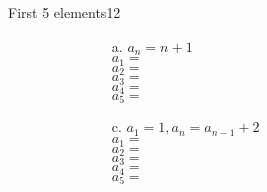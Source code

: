 \documentclass[a4paper,12pt]{book}
\begin{document}
    \hrulefill{}
    
    \begin{answersheetquestion}{2}{First 5 elements}{12}

    \begin{figure}[h]
        \centering
        \begin{subfigure}{.5\textwidth}
            \centering
            
            \begin{itemize}
                \item[a.] $a_{n} = n+1$ \\
                    $a_{1} = $ \iftoggle{answerkey}{ \begin{answer} 2 \end{answer} }{} \\
                    $a_{2} = $ \iftoggle{answerkey}{ \begin{answer} 3 \end{answer} }{} \\
                    $a_{3} = $ \iftoggle{answerkey}{ \begin{answer} 4 \end{answer} }{} \\
                    $a_{4} = $ \iftoggle{answerkey}{ \begin{answer} 5 \end{answer} }{} \\
                    $a_{5} = $ \iftoggle{answerkey}{ \begin{answer} 6 \end{answer} }{} \\
   
                \item[c.] $a_{1} = 1, a_{n} = a_{n-1} + 2$ \\
                    $a_{1} = $ \iftoggle{answerkey}{ \begin{answer} 1 \end{answer} }{} \\
                    $a_{2} = $ \iftoggle{answerkey}{ \begin{answer} 3 \end{answer} }{} \\
                    $a_{3} = $ \iftoggle{answerkey}{ \begin{answer} 5 \end{answer} }{} \\
                    $a_{4} = $ \iftoggle{answerkey}{ \begin{answer} 9 \end{answer} }{} \\
                    $a_{5} = $ \iftoggle{answerkey}{ \begin{answer} 11 \end{answer} }{} \\
            \end{itemize}
            

\end{subfigure}
\end{figure}
\end{answersheetquestion}
\end{document}
